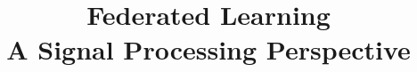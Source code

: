\usepackage{nccmath}

\showtocfalse




\title[FL - Signal Processing Perspective]{Federated Learning \\ {\smaller[2] A Signal Processing Perspective}}
\date{}




\setlength{\belowdisplayskip}{5pt} \setlength{\belowdisplayshortskip}{5pt}
\setlength{\abovedisplayskip}{5pt} \setlength{\abovedisplayshortskip}{5pt}


\begin{frame}
\titlepage %
\end{frame}


